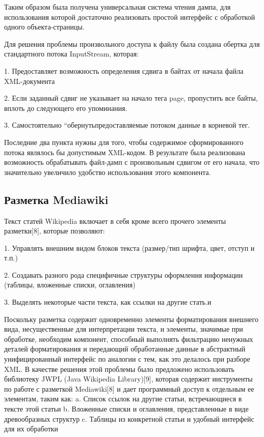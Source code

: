 
Таким образом была получена универсальная система чтения дампа, для использования которой 
достаточно реализовать простой интерфейс с обработкой одного объекта-страницы.

Для решения проблемы произвольного доступа к файлу была создана обертка для стандартного потока InputStream, которая:

1. Предоставляет возможность определения сдвига в байтах от начала файла XML-документа

2. Если заданный сдвиг не указывает на начало тега page, пропустить все байты, 
вплоть до следующего его упоминания.

3. Самостоятельно “обернутьпредоставляемые потоком данные в корневой тег.

Последние два пункта нужны для того, чтобы содержимое сформированного потока являлось бы допустимым XML-кодом.
В результате была реализована возможность обрабатывать файл-дамп с произвольным
сдвигом от его начала, что значительно увеличило удобство использования этого компонента.  

\subsection{Разметка Mediawiki}

Текст статей Wikipedia включает в себя кроме всего прочего элементы разметки[8], которые позволяют:

1. Управлять внешним видом блоков текста (размер/тип шрифта, цвет, отступ и т.п.)

2. Создавать разного рода специфичные структуры оформления информации (таблицы, вложенные списки, оглавления)

3. Выделять некоторые части текста, как ссылки на другие стать.и

Поскольку разметка содержит одновременно элементы форматирования внешнего вида,
несущественные для интерпретации текста, и элементы, значимые при обработке,
необходим компонент, способный выполнять фильтрацию ненужных деталей форматирования
и передающий обработанные данные в абстрактный унифицированный интерфейс по аналогии с тем, как это делалось при разборе XML.
В качестве решения этой проблемы было предложено использовать библиотеку 
JWPL (Java Wikipedia Library)[9], которая содержит инструменты по работе с разметкой 
Mediawiki[8] и дает программный доступ к отдельным ее элементам, таким как:
a. Список ссылок на другие статьи, встречающиеся в тексте этой статьи
b. Вложенные списки и оглавления, представленные в виде древообразных структур
c. Таблицы из конкретной статьи и удобный интерфейс для их обработки

